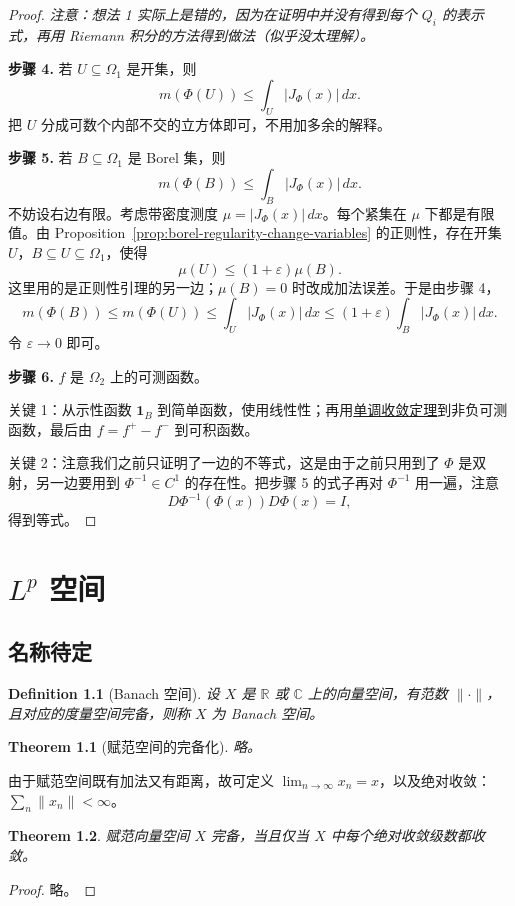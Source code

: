 \documentclass[12pt,letterpaper,twoside,openright]{ctexbook}
\theoremstyle{bluehead}
\newtheorem{theorem}{Theorem}
\theoremstyle{olivehead}
\newtheorem{definition}{Definition}
\theoremstyle{orangehead}
\theoremstyle{redremark}
\begin{document}
\begin{proof}
\textit{注意：想法 1 实际上是错的，因为在证明中并没有得到每个 $Q_i$ 的表示式，再用 Riemann 积分的方法得到做法（似乎没太理解）。}

\textbf{步骤 4.} 若 $U\subseteq\Omega_1$ 是开集，则
\[
m(\Phi(U))\leq\int_U|J_\Phi(x)|\,dx.
\]
把 $U$ 分成可数个内部不交的立方体即可，不用加多余的解释。

\textbf{步骤 5.} 若 $B\subseteq\Omega_1$ 是 Borel 集，则
\[
m(\Phi(B))\leq\int_B|J_\Phi(x)|\,dx.
\]
不妨设右边有限。考虑带密度测度 $\mu=|J_\Phi(x)|\,dx$。每个紧集在 $\mu$ 下都是有限值。由 Proposition~\ref{prop:borel-regularity-change-variables} 的正则性，存在开集 $U$，$B\subseteq U\subseteq\Omega_1$，使得
\[
\mu(U)\leq(1+\varepsilon)\mu(B).
\]
这里用的是正则性引理的另一边；$\mu(B)=0$ 时改成加法误差。于是由步骤 4，
\[
m(\Phi(B))\leq m(\Phi(U))
\leq\int_U|J_\Phi(x)|\,dx
\leq(1+\varepsilon)\int_B|J_\Phi(x)|\,dx.
\]
令 $\varepsilon\to0$ 即可。

\textbf{步骤 6.} $f$ 是 $\Omega_2$ 上的可测函数。

关键 1：从示性函数 $\mathbf1_B$ 到简单函数，使用线性性；再用\hyperref[thm:monotone-convergence]{单调收敛定理}到非负可测函数，最后由 $f=f^+-f^-$ 到可积函数。

关键 2：注意我们之前只证明了一边的不等式，这是由于之前只用到了 $\Phi$ 是双射，另一边要用到 $\Phi^{-1}\in C^1$ 的存在性。把步骤 5 的式子再对 $\Phi^{-1}$ 用一遍，注意
\[
D\Phi^{-1}(\Phi(x))D\Phi(x)=I,
\]
得到等式。
\end{proof}
\chapter{\texorpdfstring{$L^p$}{Lp} 空间}
\section{名称待定}



\begin{definition}[Banach 空间]
设 $X$ 是 $\mathbb R$ 或 $\mathbb C$ 上的向量空间，有范数 $\|\cdot\|$，且对应的度量空间完备，则称 $X$ 为 Banach 空间。
\end{definition}

\begin{theorem}[赋范空间的完备化]
略。
\end{theorem}

由于赋范空间既有加法又有距离，故可定义 $\lim_{n\to\infty}x_n=x$，以及绝对收敛：$\sum_n\|x_n\|<\infty$。

\begin{theorem}\label{thm:banach-absolute-series}
赋范向量空间 $X$ 完备，当且仅当 $X$ 中每个绝对收敛级数都收敛。
\end{theorem}
\begin{proof}
略。
\end{proof}
\end{document}

